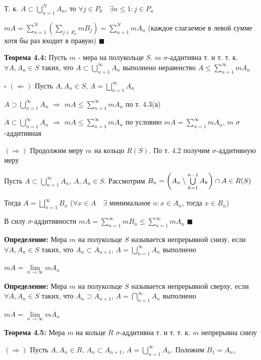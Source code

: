 \documentclass[a4paper]{report}
\newcommand*{\hm}[1]{#1\nobreak\discretionary{}%
            {\hbox{$\mathsurround=0pt #1$}}{}}
\begin{document}
Т. к. $A\subset\bigcup\limits_{n=1}^N A_n$, то $\forall j\in P_0\quad\exists n\le1\colon j\in P_n$

$mA=\sum\limits_{n=1}^N\left(\sum\limits_{j\in P_n}mB_j\right)=\sum\limits_{n=1}^N mA_n$
(каждое слагаемое в левой сумме хотя бы раз входит в правую) $\blacksquare$
\bigskip

\noindent\textbf{Теорема 4.4:} Пусть $m$ - мера на полукольце $S$. $m$ $\sigma$-аддитивна т. и т. т. к. $\forall A,A_n\in S$
таких, что $A\subset\bigcup\limits_{n=1}^\infty A_n$ выполнено неравенство $A\le\sum\limits_{n=1}^\infty mA_n$

\noindent $\square$ $(\Leftarrow)$ Пусть $A,A_n\in S$, $A=\bigsqcup\limits_{n=1}^\infty A_n$

$A\supset\bigcup\limits_{n=1}^\infty A_n$ $\Rightarrow$ $mA\le\sum\limits_{n=1}^\infty mA_n$ по т. 4.3(а)

$A\subset\bigcup\limits_{n=1}^\infty A_n$ $\Rightarrow$ $mA\le\sum\limits_{n=1}^\infty mA_n$ по условию $mA=\sum\limits_{n=1}^\infty
mA_n$, $m$ $\sigma$-аддитивная

$(\Rightarrow)$ Продолжим меру $m$ на кольцо $R(S)$. По т. 4.2 получим $\sigma$-аддитивную меру

Пусть $A\subset\bigcup\limits_{n=1}^\infty A_n$, $A,A_n\in S$. Рассмотрим $B_n=\left(A_n\setminus\bigcup\limits_{k=1}^{n-1}
A_k\right)\cap A\hm\in R(S)$

Тогда $A=\bigsqcup\limits_{n=1}^\infty B_n$ ($\forall x\in A\quad\exists$ минимальное $n\colon x\in A_n$, тогда $x\in B_n$)

В силу $\sigma$-аддитивности $mA=\sum\limits_{n=1}^\infty mB_n\le\sum\limits_{n=1}^\infty mA_n$ $\blacksquare$
\bigskip

\noindent\textbf{Определение:} Мера $m$ на полукольце $S$ называется непрерывной снизу, если $\forall A,A_n\in S$ таких,
что $A_n\subset A_{n+1}$, $A=\bigcup\limits_{n=1}^\infty A_n$ выполнено

$mA=\lim\limits_{n\to\infty}mA_n$
\bigskip

\noindent\textbf{Определение:} Мера $m$ на полукольце $S$ называется непрерывной сверху, если $\forall A,A_n\in S$ таких,
что $A_n\supset A_{n+1}$, $A=\bigcap\limits_{n=1}^\infty A_n$ выполнено

$mA=\lim\limits_{n\to\infty}mA_n$
\bigskip

\noindent\textbf{Теорема 4.5:} Мера $m$ на кольце $R$ $\sigma$-аддитивна т. и т. т. к. $m$ непрерывна снизу

\noindent $(\Rightarrow)$ Пусть $A,A_n\in R$, $A_n\subset A_{n+1}$, $A=\bigcup\limits_{n=1}^\infty A_n$. Положим $B_1=A_n$,
\end{document}
